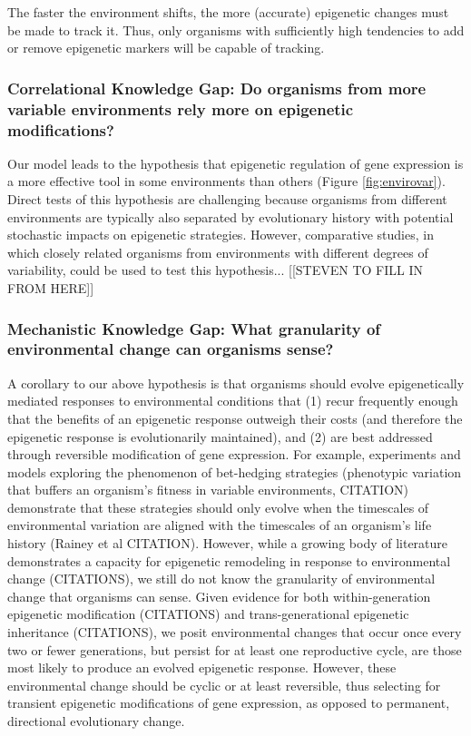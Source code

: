 \documentclass{article}
\begin{document}
The faster the environment shifts, the more (accurate) epigenetic changes must be made to track it. Thus, only organisms with sufficiently high tendencies to add or remove epigenetic markers will be capable of tracking.


\subsubsection{Correlational Knowledge Gap: Do organisms from more variable environments rely more on epigenetic modifications?}

Our model leads to the hypothesis that epigenetic regulation of gene expression is a more effective tool in some environments than others (Figure \ref{fig:envirovar}). Direct tests of this hypothesis are challenging because organisms from different environments are typically also separated by evolutionary history with potential stochastic impacts on epigenetic strategies. However, comparative studies, in which closely related organisms from environments with different degrees of variability, could be used to test this hypothesis... [[STEVEN TO FILL IN FROM HERE]]

\subsubsection{Mechanistic Knowledge Gap: What granularity of environmental change can organisms sense?}

A corollary to our above hypothesis is that organisms should evolve epigenetically mediated responses to environmental conditions that (1) recur frequently enough that the benefits of an epigenetic response outweigh their costs (and therefore the epigenetic response is evolutionarily maintained), and (2) are best addressed through reversible modification of gene expression. For example, experiments and models exploring the phenomenon of bet-hedging strategies (phenotypic variation that buffers an organism's fitness in variable environments, CITATION) demonstrate that these strategies should only evolve when the timescales of environmental variation are aligned with the timescales of an organism's life history (Rainey et al CITATION). However, while a growing body of literature demonstrates a capacity for epigenetic remodeling in response to environmental change (CITATIONS), we still do not know the granularity of environmental change that organisms can sense. Given evidence for both within-generation epigenetic modification (CITATIONS) and trans-generational epigenetic inheritance (CITATIONS), we posit environmental changes that occur once every two or fewer generations, but persist for at least one reproductive cycle, are those most likely to produce an evolved epigenetic response. However, these environmental change should be cyclic or at least reversible, thus selecting for transient epigenetic modifications of gene expression, as opposed to permanent, directional evolutionary change. 
\end{document}
